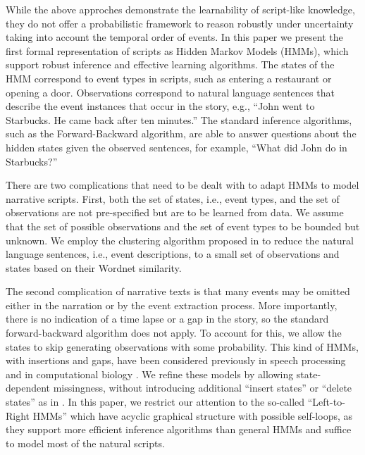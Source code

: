 \documentclass[letterpaper]{article}
\begin{document}
While the above approches demonstrate the learnability of script-like knowledge, they do not offer a probabilistic framework to reason robustly under uncertainty taking into account the temporal order of events. 
In this paper we present the first formal representation of scripts as Hidden Markov Models (HMMs), which support robust inference and effective learning algorithms.
The states of the HMM correspond to event types in scripts, such as entering a restaurant or opening a door. Observations correspond to natural language sentences that describe the event instances that occur in the story, e.g., ``John went to Starbucks. He came back after ten minutes.''  The standard inference algorithms, such as the Forward-Backward algorithm, are able to answer questions about the hidden states given the observed sentences, for example, ``What did John do in Starbucks?'' 

There are two complications that need to be dealt with to adapt HMMs to model narrative scripts. First, both the set of states, i.e., event types, and the set of observations are not pre-specified but are to be learned from data. We assume that the set of possible observations and the set of event types to be bounded but unknown. We employ the clustering algorithm proposed in \cite{regneri2010learning} to reduce the natural language sentences, i.e., event descriptions,  to a small set of observations and states based on their Wordnet similarity.

The second complication of narrative texts is that many events may be omitted either in the narration or by the event extraction process. %
More importantly, there is no indication of a time lapse or a gap in the story, so the standard forward-backward algorithm does not apply.  To account for this, we allow the states to skip generating observations with some probability. This kind of HMMs, with insertions and gaps, have been considered previously in speech processing \cite{bahl} and in computational biology \cite{profileHMMs}. We refine these models by allowing state-dependent missingness, without introducing additional ``insert states'' or ``delete states'' as in \cite{profileHMMs}. 
In this paper, we restrict our attention to the so-called ``Left-to-Right HMMs'' which 
have acyclic graphical structure with possible self-loops, as they support more efficient inference algorithms than general HMMs and suffice to model most of the natural scripts. %
\end{document}
